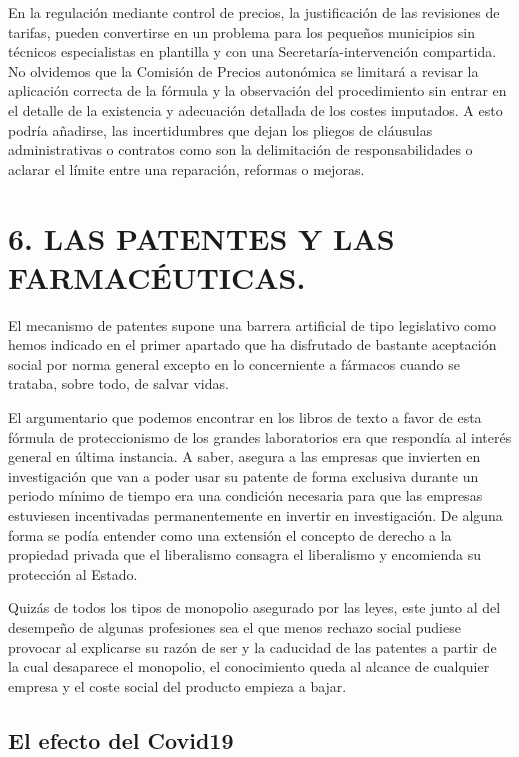 \documentclass[
]{article}
\begin{document}
En la regulación mediante control de precios, la justificación de las
revisiones de tarifas, pueden convertirse en un problema para los
pequeños municipios sin técnicos especialistas en plantilla y con una
Secretaría-intervención compartida. No olvidemos que la Comisión de
Precios autonómica se limitará a revisar la aplicación correcta de la
fórmula y la observación del procedimiento sin entrar en el detalle de
la existencia y adecuación detallada de los costes imputados. A esto
podría añadirse, las incertidumbres que dejan los pliegos de cláusulas
administrativas o contratos como son la delimitación de
responsabilidades o aclarar el límite entre una reparación, reformas o
mejoras.

\hypertarget{las-patentes-y-las-farmacuxe9uticas.}{%
\section{6. LAS PATENTES Y LAS
FARMACÉUTICAS.}\label{las-patentes-y-las-farmacuxe9uticas.}}

El mecanismo de patentes supone una barrera artificial de tipo
legislativo como hemos indicado en el primer apartado que ha disfrutado
de bastante aceptación social por norma general excepto en lo
concerniente a fármacos cuando se trataba, sobre todo, de salvar vidas.

El argumentario que podemos encontrar en los libros de texto a favor de
esta fórmula de proteccionismo de los grandes laboratorios era que
respondía al interés general en última instancia. A saber, asegura a las
empresas que invierten en investigación que van a poder usar su patente
de forma exclusiva durante un periodo mínimo de tiempo era una condición
necesaria para que las empresas estuviesen incentivadas permanentemente
en invertir en investigación. De alguna forma se podía entender como una
extensión el concepto de derecho a la propiedad privada que el
liberalismo consagra el liberalismo y encomienda su protección al
Estado.

Quizás de todos los tipos de monopolio asegurado por las leyes, este
junto al del desempeño de algunas profesiones sea el que menos rechazo
social pudiese provocar al explicarse su razón de ser y la caducidad de
las patentes a partir de la cual desaparece el monopolio, el
conocimiento queda al alcance de cualquier empresa y el coste social del
producto empieza a bajar.

\hypertarget{el-efecto-del-covid19}{%
\subsection{El efecto del Covid19}\label{el-efecto-del-covid19}}
\end{document}
